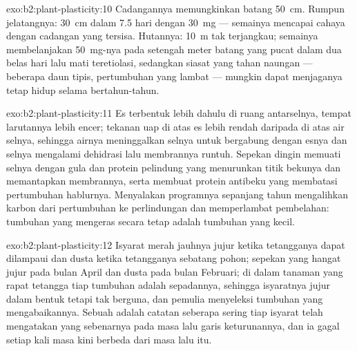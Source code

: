 \begin{solution}{exo:b2:plant-plasticity:10}
Cadangannya memungkinkan batang \qty{50}{cm}. Rumpun jelatangnya:
\qty{30}{cm} dalam 7.5 hari dengan \qty{30}{mg} --- semainya mencapai
cahaya dengan cadangan yang tersisa. Hutannya: \qty{10}{m} tak
terjangkau; semainya membelanjakan \qty{50}{mg}-nya pada setengah meter
batang yang pucat dalam dua belas hari lalu mati teretiolasi, sedangkan
siasat yang tahan naungan --- beberapa daun tipis, pertumbuhan yang
lambat --- mungkin dapat menjaganya tetap hidup selama bertahun-tahun.
\end{solution}

\begin{solution}{exo:b2:plant-plasticity:11}
Es terbentuk lebih dahulu di ruang antarselnya, tempat larutannya lebih
encer; tekanan uap di atas es lebih rendah daripada di atas air selnya,
sehingga airnya meninggalkan selnya untuk bergabung dengan esnya dan
selnya mengalami dehidrasi lalu membrannya runtuh. Sepekan dingin
memuati selnya dengan gula dan protein pelindung yang menurunkan titik
bekunya dan memantapkan membrannya, serta membuat protein antibeku yang
membatasi pertumbuhan hablurnya. Menyalakan programnya sepanjang tahun
mengalihkan karbon dari pertumbuhan ke perlindungan dan memperlambat
pembelahan: tumbuhan yang mengeras secara tetap adalah tumbuhan yang
kecil.
\end{solution}

\begin{solution}{exo:b2:plant-plasticity:12}
Isyarat merah jauhnya jujur ketika tetangganya dapat dilampaui dan
dusta ketika tetangganya sebatang pohon; sepekan yang hangat jujur pada
bulan April dan dusta pada bulan Februari; di dalam tanaman yang rapat
tetangga tiap tumbuhan adalah sepadannya, sehingga isyaratnya jujur
dalam bentuk tetapi tak berguna, dan pemulia menyeleksi tumbuhan yang
mengabaikannya. Sebuah  adalah catatan seberapa sering tiap
isyarat telah mengatakan yang sebenarnya pada masa lalu garis
keturunannya, dan ia gagal setiap kali masa kini berbeda dari masa lalu
itu.
\end{solution}

